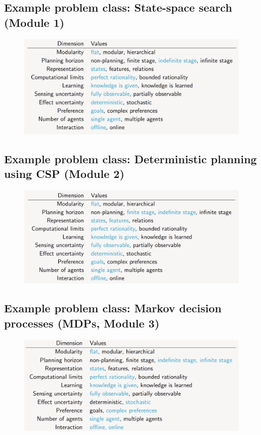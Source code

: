\documentclass[12pt]{article}
\begin{document}
\subsection*{Example problem class: State-space search (Module 1)}

\begin{figure}[h!]
        \centering
        \includegraphics[scale=0.4]{module-1.png}
        \caption{}
        \label{fig:my_label}
\end{figure}

\newpage
\subsection*{Example problem class: Deterministic planning using CSP (Module 2)}

\begin{figure}[h!]
        \centering
        \includegraphics[scale=0.4]{module-2.png}
        \caption{}
        \label{fig:my_label}
\end{figure}

\subsection*{Example problem class: Markov decision processes (MDPs, Module 3)}

\begin{figure}[h!]
        \centering
        \includegraphics[scale=0.4]{module-3.png}
        \caption{}
        \label{fig:my_label}
\end{figure}
\end{document}
